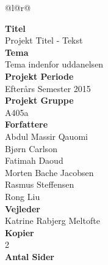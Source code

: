 
\begin{nopagebreak}
{\begin{center}
    \begin{tabular*}{\textwidth}{@{}l@{\extracolsep{\fill}}r@{}}
        \\
        \begin{minipage}[t]{0.49\textwidth}
            \textbf{Titel}\\
            Projekt Titel - Tekst\\

            \textbf{Tema}\\
            Tema indenfor uddanelsen\\

            \textbf{Projekt Periode}\\
            Efterårs Semester 2015\\

            \textbf{Projekt Gruppe}\\
            A405a\\

            \textbf{Forfattere}\\
            Abdul Massir Qauomi\\
            Bjørn Carlson\\
            Fatimah Daoud\\
            Morten Bache Jacobsen\\
            Rasmus Steffensen\\
            Rong Liu\\

            \textbf{Vejleder}\\
            Katrine Rabjerg Meltofte\\

            \textbf{Kopier}\\
            2\\ %

            \textbf{Antal Sider}\\
            \pageref{LastPage}\\


\end{minipage}
\end{tabular*}
\end{center}}
\end{nopagebreak}
